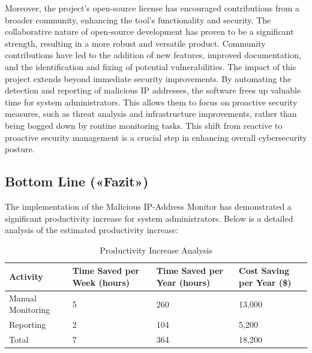 \documentclass{article}
\begin{document}
    \noindent Moreover, the project’s open-source license has encouraged contributions from a broader community, enhancing the tool's functionality and security.
    The collaborative nature of open-source development has proven to be a significant strength, resulting in a more robust and versatile product.
    Community contributions have led to the addition of new features, improved documentation, and the identification and fixing of potential vulnerabilities.
    The impact of this project extends beyond immediate security improvements.
    By automating the detection and reporting of malicious IP addresses, the software frees up valuable time for system administrators.
    This allows them to focus on proactive security measures, such as threat analysis and infrastructure improvements, rather than being bogged down by routine monitoring tasks.
    This shift from reactive to proactive security management is a crucial step in enhancing overall cybersecurity posture.

    \subsection{Bottom Line («Fazit»)}\label{sec:fazit}
    The implementation of the Malicious IP-Address Monitor has demonstrated a significant productivity increase for system administrators.
    Below is a detailed analysis of the estimated productivity increase:

    \begin{table}[H]
        \begin{flushleft}
            \begin{tabularx}{\textwidth}{|X|X|X|X|}
                \hline
                \textbf{Activity} & \textbf{Time Saved per Week (hours)} & \textbf{Time Saved per Year (hours)} & \textbf{Cost Saving per Year (\$)} \\ \hline
                Manual Monitoring & 5                                    & 260                                  & 13,000                             \\ \hline
                Reporting         & 2                                    & 104                                  & 5,200                              \\ \hline
                Total             & 7                                    & 364                                  & 18,200                             \\ \hline
            \end{tabularx}
            \caption{Productivity Increase Analysis}
            \label{tab:productivity-analysis}
        \end{flushleft}
    \end{table}
    \vspace*{-2mm}
\end{document}
